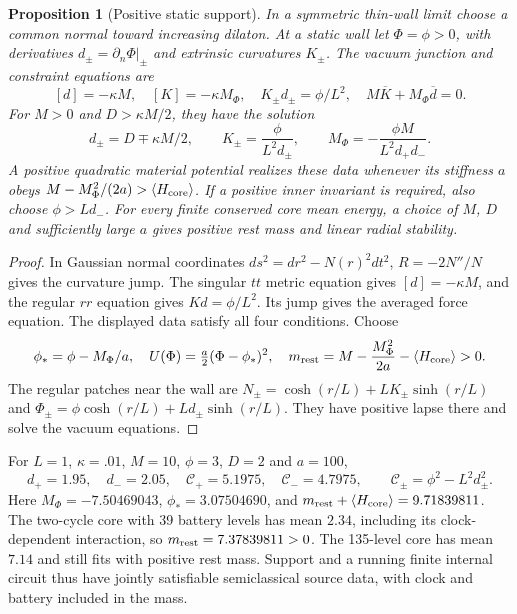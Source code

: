 \documentclass[12pt,a4paper]{article}
\newtheorem{proposition}[theorem]{Proposition}
\begin{document}
\begin{proposition}[Positive static support]
\label{prop:material-support}
In a symmetric thin-wall limit choose a common normal toward increasing
dilaton. At a static wall let $\Phi=\phi>0$, with derivatives
$d_\pm=\partial_n\Phi|_\pm$ and extrinsic curvatures $K_\pm$.
The vacuum junction and constraint equations are
\begin{equation}\label{eq:material-junction}
 [d]=-\kappa M,\quad [K]=-\kappa M_\Phi,\quad
 K_\pm d_\pm=\phi/L^2,\quad M\overline K+M_\Phi\overline d=0.
\end{equation}
For $M>0$ and $D>\kappa M/2$, they have the solution
\[
 d_\pm=D\mp\kappa M/2,\qquad
 K_\pm=\frac{\phi}{L^2d_\pm},\qquad
 M_\Phi=-\frac{\phi M}{L^2d_+d_-}.
\]
A positive quadratic material potential realizes these data whenever
its stiffness $a$ obeys $M-M_\Phi^2/(2a)>\langle H_{\rm core}\rangle$.
If a positive inner invariant is required, also choose $\phi>Ld_-$.
For every finite conserved core mean energy, a choice of $M$, $D$ and
sufficiently large $a$ gives positive rest mass and linear radial stability.
\end{proposition}
\begin{proof}
In Gaussian normal coordinates $ds^2=dr^2-N(r)^2dt^2$,
$R=-2N''/N$ gives the curvature jump. The singular $tt$ metric equation
gives $[d]=-\kappa M$, and the regular $rr$ equation gives
$Kd=\phi/L^2$. Its jump gives the averaged force equation.
The displayed data satisfy all four conditions. Choose
\[
 \phi_* =\phi-M_\Phi/a,\quad
 U(\Phi)=\tfrac a2(\Phi-\phi_*)^2,\quad
 m_{\rm rest}=M-\frac{M_\Phi^2}{2a}-\langle H_{\rm core}\rangle>0.
\]
The regular patches near the wall are
$N_\pm=\cosh(r/L)+LK_\pm\sinh(r/L)$ and
$\Phi_\pm=\phi\cosh(r/L)+Ld_\pm\sinh(r/L)$.
They have positive lapse there and solve the vacuum equations.
\end{proof}

For $L=1$, $\kappa=.01$, $M=10$, $\phi=3$, $D=2$ and $a=100$,
\[
 d_+=1.95,\quad d_-=2.05,\quad
 \mathcal C_+=5.1975,\quad \mathcal C_-=4.7975,
 \qquad \mathcal C_\pm=\phi^2-L^2d_\pm^2.
\]
Here $M_\Phi=-7.50469043$, $\phi_*=3.07504690$, and
$m_{\rm rest}+\langle H_{\rm core}\rangle=9.71839811$.
The two-cycle core with 39 battery levels has mean $2.34$, including
its clock-dependent interaction, so $m_{\rm rest}=7.37839811>0$.
The 135-level core has mean $7.14$ and still fits with positive rest mass.
Support and a running finite internal circuit thus have jointly satisfiable
semiclassical source data, with clock and battery included in the mass.
\end{document}
